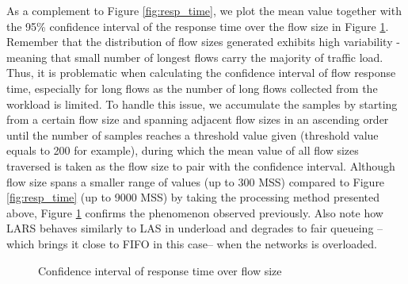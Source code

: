 \documentclass[preprint,12pt]{elsarticle}
\begin{document}
As a complement to Figure \ref{fig:resp_time}, we plot the mean value together with the 95\% confidence interval of the response time over the flow size in Figure \ref{fig:resp_time_ci}. Remember that the distribution of flow sizes generated exhibits high variability - meaning that small number of longest flows carry the majority of traffic load. Thus, it is problematic when calculating the confidence interval of flow response time, especially for long flows as the number of long flows collected from the workload is limited. To handle this issue, we accumulate the samples by starting from a certain flow size and spanning adjacent flow sizes in an ascending order until the number of samples reaches a threshold value given (threshold value equals to 200 for example), during which the mean value of all flow sizes traversed is taken as the flow size to pair with the confidence interval. Although flow size spans a smaller range of values (up to 300 MSS) compared to Figure \ref{fig:resp_time} (up to 9000 MSS) by taking the processing method presented above, Figure \ref{fig:resp_time_ci} confirms the phenomenon observed previously. %
Also note how LARS behaves similarly to LAS in underload and degrades to fair queueing --which brings it close to FIFO in this case-- when the networks is overloaded.

\begin{figure}[ht]
  \centering
  \caption{Confidence interval of response time over flow size}
  \label{fig:resp_time_ci}
\end{figure}
\end{document}

